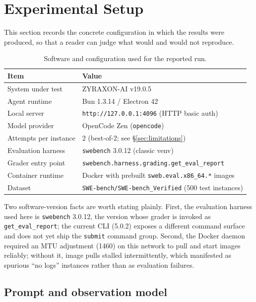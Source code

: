 \documentclass[11pt,a4paper]{article}
\begin{document}
\section{Experimental Setup}
\label{sec:setup}

This section records the concrete configuration in which the results were
produced, so that a reader can judge what would and would not reproduce.

\begin{table}[H]
\centering
\caption{Software and configuration used for the reported run.}
\label{tab:setup}
\begin{tabular}{@{}ll@{}}
\toprule
Item & Value \\
\midrule
System under test & ZYRAXON-AI v19.0.5 \\
Agent runtime & Bun 1.3.14 / Electron 42 \\
Local server & \texttt{http://127.0.0.1:4096} (HTTP basic auth) \\
Model provider & OpenCode Zen (\texttt{opencode}) \\
Attempts per instance & 2 (best-of-2; see \S\ref{sec:limitations}) \\
Evaluation harness & \texttt{swebench} 3.0.12 (classic venv) \\
Grader entry point & \texttt{swebench.harness.grading.get\_eval\_report} \\
Container runtime & Docker with prebuilt \texttt{sweb.eval.x86\_64.*} images \\
Dataset & \texttt{SWE-bench/SWE-bench\_Verified} (500 test instances) \\
\bottomrule
\end{tabular}
\end{table}

Two software-version facts are worth stating plainly. First, the evaluation harness
used here is \texttt{swebench} 3.0.12, the version whose grader is invoked as
\texttt{get\_eval\_report}; the current CLI (5.0.2) exposes a different command surface
and does not yet ship the \texttt{submit} command group. Second, the Docker daemon
required an MTU adjustment (1460) on this network to pull and start images reliably;
without it, image pulls stalled intermittently, which manifested as spurious ``no logs''
instances rather than as evaluation failures.

\subsection{Prompt and observation model}
\end{document}
